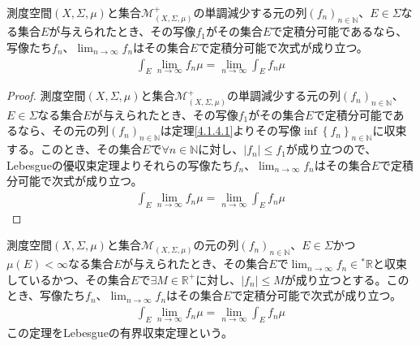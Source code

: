 \documentclass[dvipdfmx]{jsarticle}
\begin{document}
\begin{thm}\label{4.6.2.6}
測度空間$(X,\varSigma,\mu)$と集合$\mathcal{M}_{(X,\varSigma,\mu)}^{+}$の単調減少する元の列$\left( f_{n} \right)_{n \in \mathbb{N}}$、$E \in \varSigma$なる集合$E$が与えられたとき、その写像$f_{1}$がその集合$E$で定積分可能であるなら、写像たち$f_{n}$、$\lim_{n \rightarrow \infty}f_{n}$はその集合$E$で定積分可能で次式が成り立つ。
\begin{align*}
\int_{E} {\lim_{n \rightarrow \infty}f_{n}\mu} = \lim_{n \rightarrow \infty}{\int_{E} {f_{n}\mu}}
\end{align*}
\end{thm}
\begin{proof}
測度空間$(X,\varSigma,\mu)$と集合$\mathcal{M}_{(X,\varSigma,\mu)}^{+}$の単調減少する元の列$\left( f_{n} \right)_{n \in \mathbb{N}}$、$E \in \varSigma$なる集合$E$が与えられたとき、その写像$f_{1}$がその集合$E$で定積分可能であるなら、その元の列$\left( f_{n} \right)_{n \in \mathbb{N}}$は定理\ref{4.1.4.1}よりその写像$\inf\left\{ f_{n} \right\}_{n \in \mathbb{N}}$に収束する。このとき、その集合$E$で$\forall n \in \mathbb{N}$に対し、$\left| f_{n} \right| \leq f_{1}$が成り立つので、Lebesgueの優収束定理よりそれらの写像たち$f_{n}$、$\lim_{n \rightarrow \infty}f_{n}$はその集合$E$で定積分可能で次式が成り立つ。
\begin{align*}
\int_{E} {\lim_{n \rightarrow \infty}f_{n}\mu} = \lim_{n \rightarrow \infty}{\int_{E} {f_{n}\mu}}
\end{align*}
\end{proof}
\begin{thm}[Lebesgueの有界収束定理]\label{4.6.2.7}
測度空間$(X,\varSigma,\mu)$と集合$\mathcal{M}_{(X,\varSigma,\mu)}$の元の列$\left( f_{n} \right)_{n \in \mathbb{N}}$、$E \in \varSigma$かつ$\mu(E) < \infty$なる集合$E$が与えられたとき、その集合$E$で$\lim_{n \rightarrow \infty}f_{n} \in{}^{*}\mathbb{R}$と収束しているかつ、その集合$E$で$\exists M \in \mathbb{R}^{+}$に対し、$\left| f_{n} \right| \leq M$が成り立つとする。このとき、写像たち$f_{n}$、$\lim_{n \rightarrow \infty}f_{n}$はその集合$E$で定積分可能で次式が成り立つ。
\begin{align*}
\int_{E} {\lim_{n \rightarrow \infty}f_{n}\mu} = \lim_{n \rightarrow \infty}{\int_{E} {f_{n}\mu}}
\end{align*}
この定理をLebesgueの有界収束定理という。
\end{thm}
\end{document}
